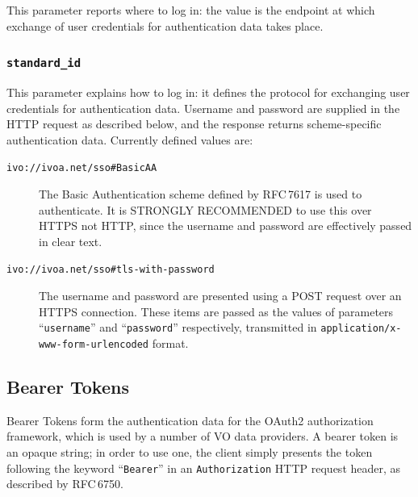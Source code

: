 \documentclass[11pt,a4paper]{ivoa}
\newcommand{\rfc}[1]{RFC\,#1}
\newcommand{\header}[1]{{\tt #1}}
\begin{document}
This parameter reports where to log in:
the value is the endpoint at which
exchange of user credentials for authentication data
takes place.

\subsubsection{\mbox{\tt standard\_id}}
\label{sec:standard-id}

This parameter explains how to log in:
it defines the protocol for exchanging user credentials
for authentication data.
Username and password are supplied in the HTTP request as described below,
and the response returns scheme-specific authentication data.
Currently defined values are:

\begin{description}
  \item[{\tt ivo://ivoa.net/sso\#BasicAA}]
        The Basic Authentication scheme defined by \rfc{7617} is used to
        authenticate.
        It is STRONGLY RECOMMENDED to use this over HTTPS not HTTP,
        since the username and password are effectively passed in clear text.
  \item[{\tt ivo://ivoa.net/sso\#tls-with-password}]
        The username and password are presented using a POST request
        over an HTTPS connection.
        These items are passed as the values of parameters
        ``{\tt username}'' and ``{\tt password}'' respectively,
        transmitted in {\tt application/x-www-form-urlencoded} format.
\end{description}



\subsection{Bearer Tokens}

Bearer Tokens form the authentication data for
the OAuth2 authorization framework,
which is used by a number of VO data providers.
A bearer token is an opaque string;
in order to use one, the client simply presents the token
following the keyword ``{\tt Bearer}''
in an \header{Authorization} HTTP request header,
as described by \rfc{6750}.
\end{document}

